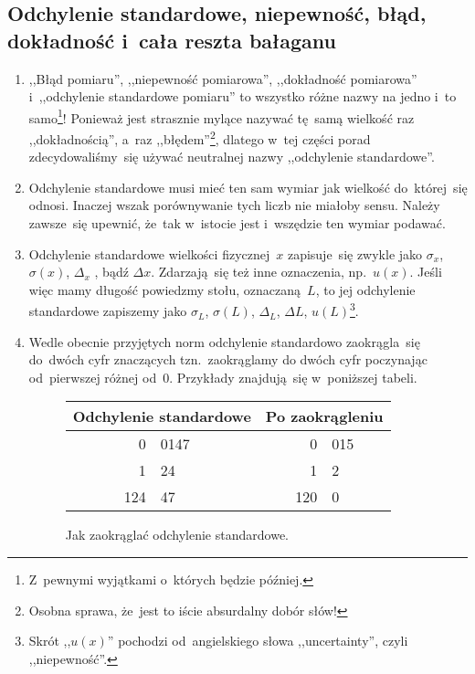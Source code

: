 \documentclass[a4paper,11pt]{article}
\begin{document}
\subsection{Odchylenie standardowe, niepewność, błąd, dokładność
  i~cała reszta bałaganu}
\label{sec:odchylenie}

\begin{enumerate}
\item ,,Błąd pomiaru'', ,,niepewność pomiarowa'', ,,dokładność
  pomiarowa'' i~,,odchylenie standardowe pomiaru'' to wszystko różne
  nazwy na jedno i~to samo\footnote{Z~pewnymi wyjątkami o~których
    będzie później.}! Ponieważ jest strasznie mylące nazywać tę~samą
  wielkość raz ,,dokładnością'', a~raz ,,błędem''\footnote{Osobna
    sprawa, że~jest to iście absurdalny dobór słów!}, dlatego w~tej
  części porad zdecydowaliśmy~się używać neutralnej nazwy ,,odchylenie
  standardowe''.

\item Odchylenie standardowe musi mieć ten sam wymiar jak wielkość
  do~której~się odnosi. Inaczej wszak porównywanie tych liczb nie
  miałoby sensu. Należy zawsze~się upewnić, że~tak w~istocie jest
  i~wszędzie ten wymiar podawać.

\item Odchylenie standardowe wielkości fizycznej~$x$ zapisuje~się
  zwykle jako $\sigma_{ x }$, $\sigma( x )$, $\Delta_{ x }$ , bądź
  $\Delta x$. Zdarzają~się też inne oznaczenia, np.~$u( x )$. Jeśli
  więc mamy długość powiedzmy stołu, oznaczaną~$L$, to jej odchylenie
  standardowe zapiszemy jako $\sigma_{ L }$, $\sigma( L )$,
  $\Delta_{ L }$, $\Delta L$, $u( L )$\footnote{Skrót ,,$u( x )$''
    pochodzi od~angielskiego słowa ,,uncertainty'', czyli
    ,,niepewność''.}.

\item Wedle obecnie przyjętych norm odchylenie standardowo
  zaokrągla~się do~dwóch cyfr znaczących tzn.~zaokrąglamy do dwóch
  cyfr poczynając od~pierwszej różnej od~0. Przykłady znajdują~się
  w~poniższej tabeli.
  \begin{figure}[h]
    \centering
    \begin{tabular}[h]{|r @{.} l |r @{.} l|}
      \hline
      \multicolumn{2}{|c}{Odchylenie standardowe}
      & \multicolumn{2}{|c|}{Po zaokrągleniu} \\
      \hline
      0&0147 & 0&015 \\
      1&24   & 1&2 \\
      124&47 & 120&0 \\
      \hline
    \end{tabular}
    \caption{Jak zaokrąglać odchylenie standardowe.}
    \label{fig:odchylenie}
  \end{figure}


\end{enumerate}
\end{document}
